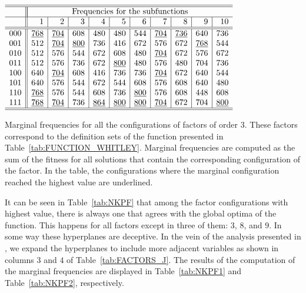 \documentclass{article} %
\begin{document}
\begin{table}[htb]
\scriptsize
\begin{center}
{$\begin{array}{c||r|r|r|r|r|r|r|r|r|r} \hline \hline
  &  \multicolumn{10}{|c}{\text{Frequencies for the subfunctions}} \\  \hline  
     &  1   &  2   &  3   & 4    &  5   &  6   & 7    &  8   & 9    & 10 \\  \hline  \hline
000  & \underline{768}  & \underline{704}  & 608  & 480  & 480  & 544  & \underline{704}  & \underline{736}  & 640  & 736 \\
001  & 512              & \underline{704}  & \underline{800}  & 736  & 416  & 672  & 576  & 672  & \underline{768}  & 544 \\
010  & 512                          & 576  & 544  & 672  & 608  & 480  & \underline{704}  & 672  & 576  & 672 \\ 
011  & 512                          & 576  & 736  & 672  & \underline{800}  & 480  & 576  & 480  & 704  & 736 \\
100  & 640              & \underline{704}  & 608  & 416  & 736  & 736  & \underline{704}  & 672  & 640  & 544 \\
101  & 640                          & 576  & 544  & 672  & 544  & 608  & 576  & 608  & 640  & 480 \\
110  & \underline{768}              & 576  & 544  & 608  & 736  & \underline{800}  & 576  & 608  & 448  & 608 \\
111  & \underline{768}  & \underline{704}  & 736  & \underline{864}  & \underline{800}  & \underline{800}  & \underline{704}  & 672  & 704  & \underline{800} \\ \hline \hline  
    \end{array}$}
\caption{Marginal frequencies for all the configurations of factors of order $3$. These factors correspond to the definition sets of the function presented in Table~\ref{tab:FUNCTION_WHITLEY}. Marginal frequencies are computed as the sum of the fitness for all solutions that contain the corresponding configuration of the factor. In the table, the configurations where the marginal configuration reached the highest value are underlined.}
\label{tab:NKPF}
\end{center}
\end{table}

It can be seen in Table~\ref{tab:NKPF} that among the factor configurations  with highest value, there is always one that agrees with the global optima of the function. This happens for all factors except in three of them: $3$, $8$, and $9$. In some way these hyperplanes are deceptive. In the vein of the analysis presented in  \cite{Whitley:2015}, we expand the hyperplanes to include more adjacent variables as shown in columns $3$ and $4$ of Table~\ref{tab:FACTORS_J}. The results of the computation of the marginal frequencies are displayed in Table~\ref{tab:NKPF1} and Table~\ref{tab:NKPF2}, respectively.
\end{document}
